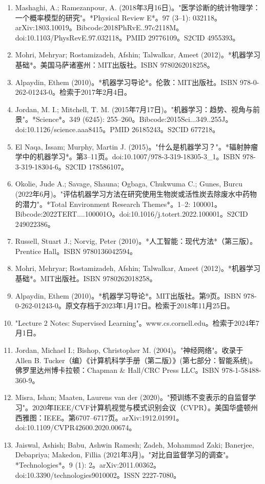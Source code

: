 \begin{enumerate}
\item Mashaghi, A.; Ramezanpour, A. (2018年3月16日)。"医学诊断的统计物理学：一个概率模型的研究"。*Physical Review E*。97 (3–1): 032118。arXiv:1803.10019。Bibcode:2018PhRvE..97c2118M。doi:10.1103/PhysRevE.97.032118。PMID 29776109。S2CID 4955393。  
\item Mohri, Mehryar; Rostamizadeh, Afshin; Talwalkar, Ameet (2012)。*机器学习基础*。美国马萨诸塞州：MIT出版社。ISBN 9780262018258。  
\item Alpaydin, Ethem (2010)。*机器学习导论*。伦敦：MIT出版社。ISBN 978-0-262-01243-0。检索于2017年2月4日。  
\item Jordan, M. I.; Mitchell, T. M. (2015年7月17日)。"机器学习：趋势、视角与前景"。*Science*。349 (6245): 255–260。Bibcode:2015Sci...349..255J。doi:10.1126/science.aaa8415。PMID 26185243。S2CID 677218。  
\item El Naqa, Issam; Murphy, Martin J. (2015)。"什么是机器学习？"。*辐射肿瘤学中的机器学习*。第3–11页。doi:10.1007/978-3-319-18305-3_1。ISBN 978-3-319-18304-6。S2CID 178586107。  
\item Okolie, Jude A.; Savage, Shauna; Ogbaga, Chukwuma C.; Gunes, Burcu (2022年6月)。"评估机器学习方法在研究使用生物炭或活性炭去除废水中药物的潜力"。*Total Environment Research Themes*。1–2: 100001。
Bibcode:2022TERT....100001O。doi:10.1016/j.totert.2022.100001。S2CID 249022386。  
\item Russell, Stuart J.; Norvig, Peter (2010)。*人工智能：现代方法*（第三版）。Prentice Hall。ISBN 9780136042594。  
\item Mohri, Mehryar; Rostamizadeh, Afshin; Talwalkar, Ameet (2012)。*机器学习基础*。MIT出版社。ISBN 9780262018258。  
\item Alpaydin, Ethem (2010)。*机器学习导论*。MIT出版社。第9页。ISBN 978-0-262-01243-0。原文存档于2023年1月17日。检索于2018年11月25日。  
\item "Lecture 2 Notes: Supervised Learning"。www.cs.cornell.edu。检索于2024年7月1日。
\item Jordan, Michael I.; Bishop, Christopher M. (2004)。"神经网络"。收录于 Allen B. Tucker（编）《计算机科学手册（第二版）》(第七部分：智能系统)。佛罗里达州博卡拉顿：Chapman & Hall/CRC Press LLC。ISBN 978-1-58488-360-9。  
\item Misra, Ishan; Maaten, Laurens van der (2020)。"预训练不变表示的自监督学习"。2020年IEEE/CVF计算机视觉与模式识别会议（CVPR）。美国华盛顿州西雅图：IEEE。第6707–6717页。arXiv:1912.01991。doi:10.1109/CVPR42600.2020.00674。  
\item Jaiswal, Ashish; Babu, Ashwin Ramesh; Zadeh, Mohammad Zaki; Banerjee, Debapriya; Makedon, Fillia (2021年3月)。"对比自监督学习的调查"。*Technologies*。9 (1): 2。arXiv:2011.00362。doi:10.3390/technologies9010002。ISSN 2227-7080。  

\end{enumerate}
